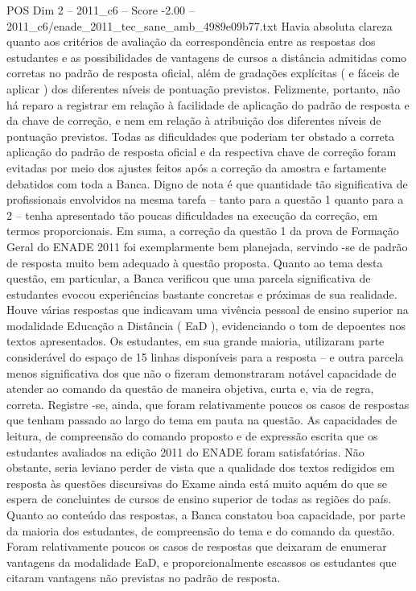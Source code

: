 \begin{textsample}{POS Dim 2 – 2011\_c6 – Score -2.00 – 2011\_c6/enade\_2011\_tec\_sane\_amb\_4989e09b77.txt}
Havia absoluta clareza quanto aos critérios de avaliação da correspondência entre as respostas dos estudantes e as possibilidades de vantagens de cursos a distância admitidas como corretas no padrão de resposta oficial, além de gradações explícitas ( e fáceis de aplicar ) dos diferentes níveis de pontuação previstos.
Felizmente, portanto, não há reparo a registrar em relação à facilidade de aplicação do padrão de resposta e da chave de correção, e nem em relação à atribuição dos diferentes níveis de pontuação previstos.
Todas as dificuldades que poderiam ter obstado a correta aplicação do padrão de resposta oficial e da respectiva chave de correção foram evitadas por meio dos ajustes feitos após a correção da amostra e fartamente debatidos com toda a Banca.
Digno de nota é que quantidade tão significativa de profissionais envolvidos na mesma tarefa – tanto para a questão 1 quanto para a 2 – tenha apresentado tão poucas dificuldades na execução da correção, em termos proporcionais.
Em suma, a correção da questão 1 da prova de Formação Geral do ENADE 2011 foi exemplarmente bem planejada, servindo -se de padrão de resposta muito bem adequado à questão proposta.
Quanto ao tema desta questão, em particular, a Banca verificou que uma parcela significativa de estudantes evocou experiências bastante concretas e próximas de sua realidade.
Houve várias respostas que indicavam uma vivência pessoal de ensino superior na modalidade Educação a Distância ( EaD ), evidenciando o tom de depoentes nos textos apresentados.
Os estudantes, em sua grande maioria, utilizaram parte considerável do espaço de 15 linhas disponíveis para a resposta – e outra parcela menos significativa dos que não o fizeram demonstraram notável capacidade de atender ao comando da questão de maneira objetiva, curta e, via de regra, correta.
Registre -se, ainda, que foram relativamente poucos os casos de respostas que tenham passado ao largo do tema em pauta na questão.
As capacidades de leitura, de compreensão do comando proposto e de expressão escrita que os estudantes avaliados na edição 2011 do ENADE foram satisfatórias.
Não obstante, seria leviano perder de vista que a qualidade dos textos redigidos em resposta às questões discursivas do Exame ainda está muito aquém do que se espera de concluintes de cursos de ensino superior de todas as regiões do país.
Quanto ao conteúdo das respostas, a Banca constatou boa capacidade, por parte da maioria dos estudantes, de compreensão do tema e do comando da questão.
Foram relativamente poucos os casos de respostas que deixaram de enumerar vantagens da modalidade EaD, e proporcionalmente escassos os estudantes que citaram vantagens não previstas no padrão de resposta.

\end{textsample}
